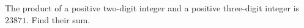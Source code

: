 The product of a positive two-digit integer and a positive three-digit integer is $23871$. Find their sum.
